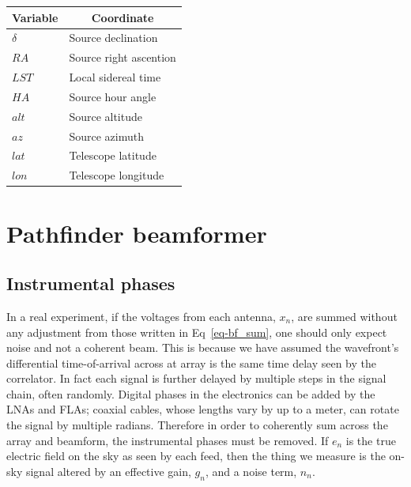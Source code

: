 \begin{table}[]
\centering
\label{tab-coord_var}
\begin{tabular}{ll}
\multicolumn{1}{c}{\textbf{Variable}} & \multicolumn{1}{c}{\textbf{Coordinate}} \\ \hline
$\delta$                              & Source declination                      \\
$RA$                                    & Source right ascention                  \\
$LST$                                   & Local sidereal time                     \\
$HA$                                    & Source hour angle                       \\
$alt$                                   & Source altitude                         \\
$az$                                    & Source azimuth                          \\
$lat$                                   & Telescope latitude                      \\
$lon$                                   & Telescope longitude                    
\end{tabular}
\end{table}

\section{Pathfinder beamformer}

\subsection{Instrumental phases}
\label{sec-instr_phases}
In a real experiment, if the voltages from each antenna, $x_n$, are summed 
without any adjustment from those written in Eq~\ref{eq-bf_sum}, one should only 
expect noise and not a coherent beam. This is because we have assumed 
the wavefront's differential time-of-arrival across at array 
is the same time delay seen by the correlator. In fact each 
signal is further delayed by multiple steps in the signal chain, 
often randomly. 
Digital phases in the electronics can be added by the LNAs and FLAs; 
coaxial cables, whose lengths vary by up to a meter, can rotate 
the signal by multiple radians. Therefore in order to coherently sum 
across the array and beamform, the instrumental phases must be removed. 
If $e_n$ is the true electric field on the 
sky as seen by each feed, then the thing we measure is the on-sky signal
altered by an effective gain, $g_n$, and a noise term, $n_n$.

